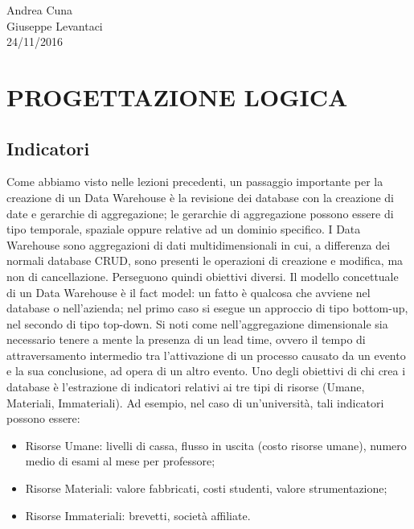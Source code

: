 \begin{flushright}Andrea Cuna\\Giuseppe Levantaci\\24/11/2016\end{flushright}


\section{PROGETTAZIONE LOGICA}


\subsection{Indicatori}

Come abbiamo visto nelle lezioni precedenti, un passaggio importante per la creazione di un Data Warehouse è la revisione dei database con la creazione di date e gerarchie di aggregazione; le gerarchie di aggregazione possono essere di tipo temporale, spaziale oppure relative ad un dominio specifico. I Data Warehouse sono aggregazioni di dati multidimensionali in cui, a differenza dei normali database CRUD, sono presenti le operazioni di creazione e modifica, ma non di cancellazione. Perseguono quindi obiettivi diversi. Il modello concettuale di un Data Warehouse è il fact model: un fatto è qualcosa che avviene nel database o nell’azienda; nel primo caso si esegue un approccio di tipo bottom-up, nel secondo di tipo top-down. Si noti come nell’aggregazione dimensionale sia necessario tenere a mente la presenza di un lead time, ovvero il tempo di attraversamento intermedio tra l’attivazione di un processo causato da un evento e la sua conclusione, ad opera di un altro evento.  Uno degli obiettivi di chi crea i database è l’estrazione di indicatori relativi ai tre tipi di risorse (Umane, Materiali, Immateriali). Ad esempio, nel caso di un’università, tali indicatori possono essere: 

\begin{itemize}

\item{Risorse Umane}: livelli di cassa, flusso in uscita (costo risorse umane), numero medio di esami al mese per professore;
\item{Risorse Materiali}: valore fabbricati, costi studenti, valore strumentazione;
\item{Risorse Immateriali}: brevetti, società affiliate.  

\end{itemize}

